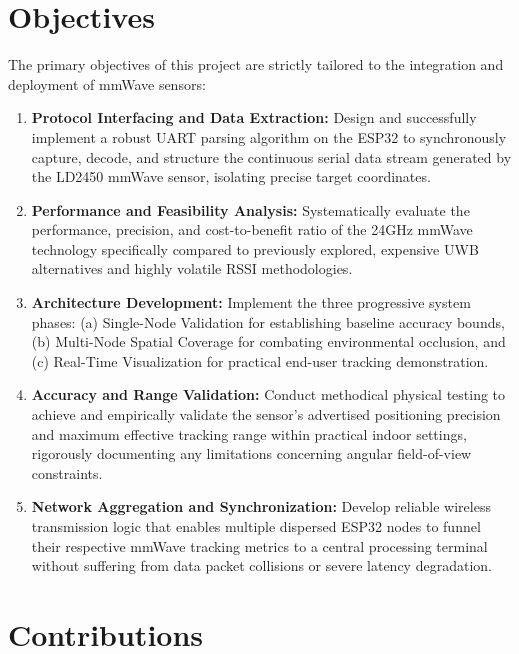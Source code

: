 \section{Objectives}

The primary objectives of this project are strictly tailored to the integration and deployment of mmWave sensors:

\begin{enumerate}
    \item \textbf{Protocol Interfacing and Data Extraction:} Design and successfully implement a robust UART parsing algorithm on the ESP32 to synchronously capture, decode, and structure the continuous serial data stream generated by the LD2450 mmWave sensor, isolating precise target coordinates.
    
    \item \textbf{Performance and Feasibility Analysis:} Systematically evaluate the performance, precision, and cost-to-benefit ratio of the 24GHz mmWave technology specifically compared to previously explored, expensive UWB alternatives and highly volatile RSSI methodologies.
    
    \item \textbf{Architecture Development:} Implement the three progressive system phases: (a) Single-Node Validation for establishing baseline accuracy bounds, (b) Multi-Node Spatial Coverage for combating environmental occlusion, and (c) Real-Time Visualization for practical end-user tracking demonstration.
    
    \item \textbf{Accuracy and Range Validation:} Conduct methodical physical testing to achieve and empirically validate the sensor's advertised positioning precision and maximum effective tracking range within practical indoor settings, rigorously documenting any limitations concerning angular field-of-view constraints.
    
    \item \textbf{Network Aggregation and Synchronization:} Develop reliable wireless transmission logic that enables multiple dispersed ESP32 nodes to funnel their respective mmWave tracking metrics to a central processing terminal without suffering from data packet collisions or severe latency degradation.
\end{enumerate}

\section{Contributions}

